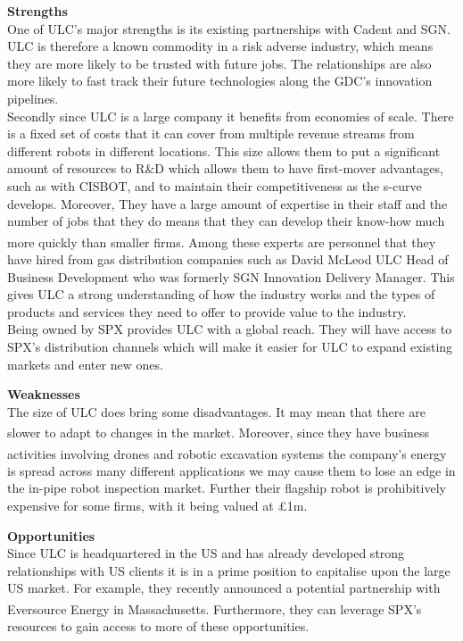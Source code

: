 \documentclass[11pt]{article}		%
\newcommand{\supercite}[1]{\textsuperscript{\cite{#1}}}		%
\begin{document}
	        \textbf{Strengths}
	        \\
	        One of ULC's major strengths is its existing partnerships with Cadent and SGN. ULC is therefore a known commodity in a risk adverse industry, which means they are more likely to be trusted with future jobs. The relationships are also more likely to fast track their future technologies along the GDC's innovation pipelines. 
	        \\
            \hspace*{3ex}Secondly since ULC is a large company it benefits from economies of scale. There is a fixed set of costs that it can cover from multiple revenue streams from different robots in different locations. This size allows them to put a significant amount of resources to R\&D which allows them to have first-mover advantages, such as with CISBOT, and to maintain their competitiveness as the s-curve develops. Moreover, They have a large amount of expertise in their staff and the number of jobs that they do means that they can develop their know-how much more quickly than smaller firms.\supercite{Barney} 
	        Among these experts are personnel that they have hired from gas distribution companies such as David McLeod ULC Head of Business Development who was formerly SGN Innovation Delivery Manager. This gives ULC a strong understanding of how the industry works and the types of products and services they need to offer to provide value to the industry.
	        \\
            \hspace*{3ex}Being owned by SPX provides ULC with a global reach. They will have access to SPX's distribution channels which will make it easier for ULC to expand existing markets and enter new ones.
	        
	        \textbf{Weaknesses}
	        \\
	        The size of ULC does bring some disadvantages. It may mean that there are slower to adapt to changes in the market\supercite{ULC_Slow}. Moreover, since they have business activities involving drones and robotic excavation systems\supercite{ULC_news} the company's energy is spread across many different applications we may cause them to lose an edge in the in-pipe robot inspection market. Further their flagship robot is prohibitively expensive for some firms, with it being valued at £1m.
	        
	        \textbf{Opportunities}
	        \\
	        Since ULC is headquartered in the US and has already developed strong relationships with US clients it is in a prime position to capitalise upon the large US market. For example, they recently announced a potential partnership with Eversource Energy in Massachusetts\supercite{ULC_news}. Furthermore, they can leverage SPX's resources to gain access to more of these opportunities.
	        
\end{document}
